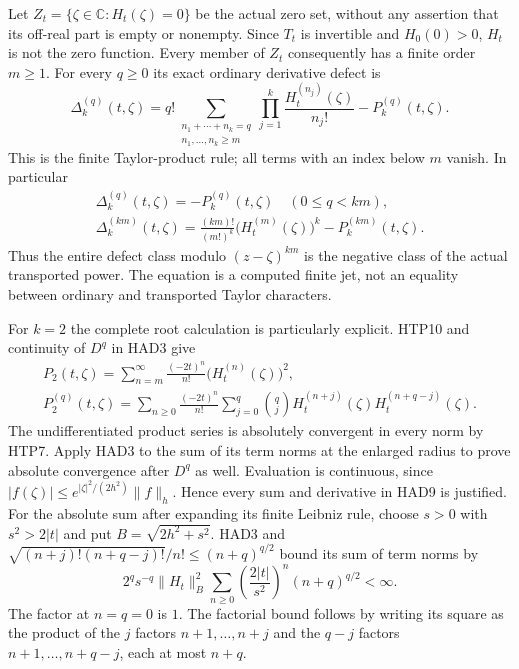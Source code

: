 Let $Z_t=\{\zeta\in\mathbb C:H_t(\zeta)=0\}$ be the
actual zero set, without any assertion that its off-real
part is empty or nonempty. Since $T_t$ is invertible and
$H_0(0)>0$, $H_t$ is not the zero function. Every member
of $Z_t$ consequently has a finite order $m\ge1$.
For every $q\ge0$ its exact ordinary derivative defect is
\begin{equation}\tag{HAD7}
 \Delta_k^{(q)}(t,\zeta)=
 q!\!\sum_{\substack{n_1+\cdots+n_k=q\\n_1,\ldots,n_k\ge m}}
       \prod_{j=1}^k\frac{H_t^{(n_j)}(\zeta)}{n_j!}
                              -P_k^{(q)}(t,\zeta).
\end{equation}
This is the finite Taylor-product rule; all terms with an
index below $m$ vanish. In particular
\begin{equation}\tag{HAD8}
\begin{gathered}
 \Delta_k^{(q)}(t,\zeta)=-P_k^{(q)}(t,\zeta)\quad(0\le q<km),\\
 \Delta_k^{(km)}(t,\zeta)
   =\frac{(km)!}{(m!)^k}\bigl(H_t^{(m)}(\zeta)\bigr)^k
                                      -P_k^{(km)}(t,\zeta).
\end{gathered}
\end{equation}
Thus the entire defect class modulo $(z-\zeta)^{km}$ is
the negative class of the actual transported power.
The equation is a computed finite jet, not an equality
between ordinary and transported Taylor characters.

For $k=2$ the complete root calculation is particularly
explicit. HTP10 and continuity of $D^q$ in HAD3 give
\begin{equation}\tag{HAD9}
\begin{gathered}
 P_2(t,\zeta)=\sum_{n=m}^{\infty}
       \frac{(-2t)^n}{n!}\bigl(H_t^{(n)}(\zeta)\bigr)^2,\\
 P_2^{(q)}(t,\zeta)=\sum_{n\ge0}\frac{(-2t)^n}{n!}
       \sum_{j=0}^q\binom qj
            H_t^{(n+j)}(\zeta)H_t^{(n+q-j)}(\zeta).
\end{gathered}
\end{equation}
The undifferentiated product series is absolutely convergent
in every norm by HTP7. Apply HAD3 to the sum of its term
norms at the enlarged radius to prove absolute convergence
after $D^q$ as well. Evaluation is continuous, since
$|f(\zeta)|\le e^{|\zeta|^2/(2h^2)}\|f\|_h$.
Hence every sum and derivative in HAD9 is justified.
For the absolute sum after expanding its finite Leibniz
rule, choose $s>0$ with $s^2>2|t|$ and put $B=\sqrt{2h^2+s^2}$.
HAD3 and
$\sqrt{(n+j)!(n+q-j)!}/n!\le(n+q)^{q/2}$
bound its sum of term norms by
\[
 2^qs^{-q}\|H_t\|_B^2
       \sum_{n\ge0}\left(\frac{2|t|}{s^2}\right)^n
                                (n+q)^{q/2}<\infty.
\]
The factor at $n=q=0$ is $1$. The factorial bound follows
by writing its square as the product of the $j$ factors
$n+1,\ldots,n+j$ and the $q-j$ factors
$n+1,\ldots,n+q-j$, each at most $n+q$.

